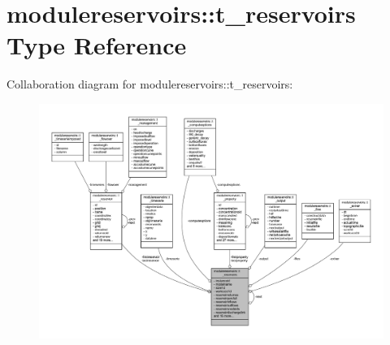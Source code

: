 \hypertarget{structmodulereservoirs_1_1t__reservoirs}{}\section{modulereservoirs\+:\+:t\+\_\+reservoirs Type Reference}
\label{structmodulereservoirs_1_1t__reservoirs}


Collaboration diagram for modulereservoirs\+:\+:t\+\_\+reservoirs\+:\nopagebreak
\begin{figure}[H]
\begin{center}
\leavevmode
\includegraphics[width=350pt]{structmodulereservoirs_1_1t__reservoirs__coll__graph}
\end{center}
\end{figure}

